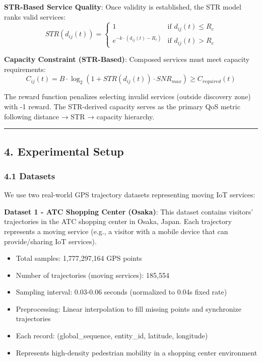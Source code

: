 \documentclass[
  10pt,
  twocolumn,
]{article}
\providecommand{\tightlist}{%
  \setlength{\itemsep}{0pt}\setlength{\parskip}{0pt}}
\begin{document}
\textbf{STR-Based Service Quality}: Once validity is established, the
STR model ranks valid services:
\[STR(d_{ij}(t)) = \begin{cases} 1 & \text{if } d_{ij}(t) \leq R_c \\ e^{-k \cdot (d_{ij}(t) - R_c)} & \text{if } d_{ij}(t) > R_c \end{cases}\]

\textbf{Capacity Constraint (STR-Based)}: Composed services must meet
capacity requirements:
\[C_{ij}(t) = B \cdot \log_2(1 + STR(d_{ij}(t)) \cdot SNR_{max}) \geq C_{required}(t)\]

The reward function penalizes selecting invalid services (outside
discovery zone) with -1 reward. The STR-derived capacity serves as the
primary QoS metric following distance → STR → capacity hierarchy.

\begin{center}\rule{0.5\linewidth}{0.5pt}\end{center}

\hypertarget{experimental-setup}{%
	\subsection{4. Experimental Setup}\label{experimental-setup}}

\hypertarget{datasets}{%
	\subsubsection{4.1 Datasets}\label{datasets}}

We use two real-world GPS trajectory datasets representing moving IoT
services:

\textbf{Dataset 1 - ATC Shopping Center (Osaka)}: This dataset contains
visitors' trajectories in the ATC shopping center in Osaka, Japan. Each
trajectory represents a moving service (e.g., a visitor with a mobile
device that can provide/sharing IoT services).

\begin{itemize}
	\tightlist
	\item
	      Total samples: 1,777,297,164 GPS points
	\item
	      Number of trajectories (moving services): 185,554
	\item
	      Sampling interval: 0.03-0.06 seconds (normalized to 0.04s fixed rate)
	\item
	      Preprocessing: Linear interpolation to fill missing points and
	      synchronize trajectories
	\item
	      Each record: (global\_sequence, entity\_id, latitude, longitude)
	\item
	      Represents high-density pedestrian mobility in a shopping center
	      environment
\end{itemize}
\end{document}
